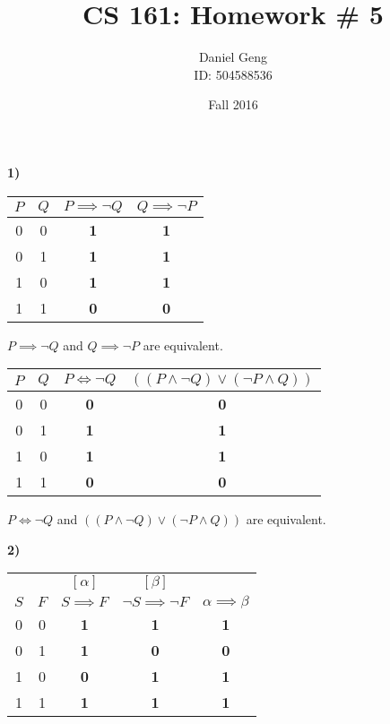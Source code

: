 \documentclass[11pt, oneside]{article}   	%
\title{CS 161: Homework \# 5}
\author{Daniel Geng\\ID: 504588536}
\date{Fall 2016}							%
\begin{document}
\maketitle

\textbf{1)}

\begin{tabular}{ c | c | c | c }
$P$ & $Q$ & $P \implies \neg Q$ & $Q \implies \neg P$ \\
\hline
0 & 0 & \textbf{1} & \textbf{1} \\
0 & 1 & \textbf{1} & \textbf{1} \\
1 & 0 & \textbf{1} & \textbf{1} \\
1 & 1 & \textbf{0} & \textbf{0} 
\end{tabular}

$P \implies \neg Q$ and $Q \implies \neg P$ are equivalent.

\begin{tabular}{ c | c | c | c }
$P$ & $Q$ & $P \iff \neg Q$ & $((P \land \neg Q) \lor (\neg P \land Q))$ \\
\hline
0 & 0 & \textbf{0} & \textbf{0} \\
0 & 1 & \textbf{1} & \textbf{1} \\
1 & 0 & \textbf{1} & \textbf{1} \\
1 & 1 & \textbf{0} & \textbf{0} 
\end{tabular}

$P \iff \neg Q$ and $((P \land \neg Q) \lor (\neg P \land Q))$ are equivalent.

\textbf{2)}

\begin{tabular}{ c | c | c | c | c}
& & $[\alpha]$ & $[\beta]$ & \\
$S$ & $F$ & $S \implies F$ & $\neg S \implies \neg F$ & $\alpha \implies \beta$ \\
\hline
0 & 0 & \textbf{1} & \textbf{1} & \textbf{1} \\
0 & 1 & \textbf{1} & \textbf{0} & \textbf{0} \\
1 & 0 & \textbf{0} & \textbf{1} & \textbf{1} \\
1 & 1 & \textbf{1} & \textbf{1} & \textbf{1}
\end{tabular}
\end{document}
